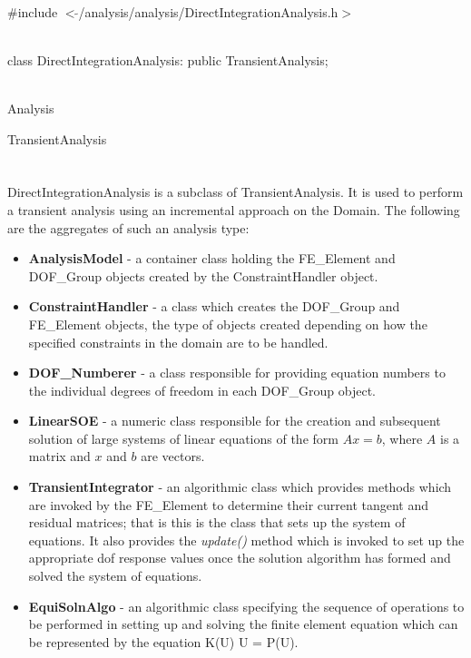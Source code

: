 
   \\
\#include $<\tilde{ }$/analysis/analysis/DirectIntegrationAnalysis.h$>$  


  \\
class DirectIntegrationAnalysis: public TransientAnalysis;  


 \\
Analysis 

\indent\indent TransientAnalysis \\
\indent\indent{} \\

 \\ 
\indent DirectIntegrationAnalysis is a subclass of TransientAnalysis. It
is used to perform a transient analysis using an incremental approach
on the Domain. The following are the aggregates of such an analysis type: 
\begin{itemize}
\item {\bf AnalysisModel} - a container class holding the FE\_Element
and DOF\_Group objects created by the ConstraintHandler object. 
\item {\bf ConstraintHandler} - a class which creates the DOF\_Group
and FE\_Element objects, the type of objects created depending on how
the specified constraints in the domain are to be handled. 
\item {\bf DOF\_Numberer} - a class responsible for providing equation
numbers to the individual degrees of freedom in each DOF\_Group object.
\item {\bf LinearSOE} - a numeric class responsible for the creation
and subsequent solution of large systems of linear equations of the
form $Ax = b$, where $A$ is a matrix and $x$ and $b$ are vectors.
\item {\bf TransientIntegrator} - an algorithmic class which provides
methods which are invoked by the FE\_Element to determine their
current tangent and residual matrices; that is this is the class that
sets up the system of equations.  It also provides the {\em
update()} method which is invoked to set up the appropriate dof
response values once the solution algorithm has formed and solved the
system of equations.
\item {\bf EquiSolnAlgo} - an algorithmic class specifying the
sequence of operations to be performed in setting up and solving the
finite element equation which can be represented by the equation K(U)
U = P(U). 
\end{itemize}


